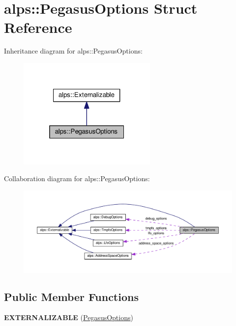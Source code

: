 \hypertarget{structalps_1_1PegasusOptions}{}\section{alps\+:\+:Pegasus\+Options Struct Reference}
\label{structalps_1_1PegasusOptions}


Inheritance diagram for alps\+:\+:Pegasus\+Options\+:
\nopagebreak
\begin{figure}[H]
\begin{center}
\leavevmode
\includegraphics[width=193pt]{structalps_1_1PegasusOptions__inherit__graph}
\end{center}
\end{figure}


Collaboration diagram for alps\+:\+:Pegasus\+Options\+:
\nopagebreak
\begin{figure}[H]
\begin{center}
\leavevmode
\includegraphics[width=350pt]{structalps_1_1PegasusOptions__coll__graph}
\end{center}
\end{figure}
\subsection*{Public Member Functions}
\begin{DoxyCompactItemize}
\item 
{\bfseries E\+X\+T\+E\+R\+N\+A\+L\+I\+Z\+A\+B\+LE} (\hyperlink{structalps_1_1PegasusOptions}{Pegasus\+Options})\hypertarget{structalps_1_1PegasusOptions_afdff20a8d8b89d05a7d2d9126e852638}{}\label{structalps_1_1PegasusOptions_afdff20a8d8b89d05a7d2d9126e852638}

\end{DoxyCompactItemize}
